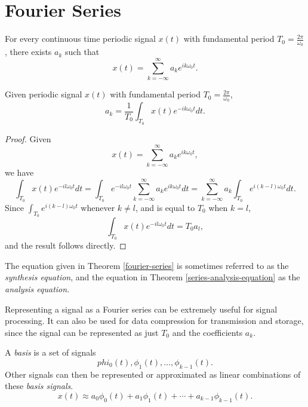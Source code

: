 \section{Fourier Series}

\begin{thm}\label{fourier-series}
    For every continuous time periodic signal $x(t)$ with fundamental period $T_0 = \frac{2\pi}{\omega_0}$, there exists $a_k$ such that
    \[x(t) = \sum_{k=-\infty}^{\infty}a_ke^{ik\omega_0t}.\]
\end{thm}

\begin{thm}\label{series-analysis-equation}
    Given periodic signal $x(t)$ with fundamental period $T_0 = \frac{2\pi}{\omega_0}$,
    \[a_k = \frac{1}{T_0}\int_{T_0}x(t)e^{-ik\omega_0t}dt.\]
\end{thm}

\begin{proof}
    Given \[x(t) = \sum_{k=-\infty}^{\infty}a_ke^{ik\omega_0t},\]
    we have
    \[\int_{T_0}x(t)e^{-il\omega_0t}dt = \int_{T_0}e^{-il\omega_0t}\sum_{k=-\infty}^{\infty}a_ke^{ik\omega_0t}dt = \sum_{k=-\infty}^{\infty}a_k\int_{T_0}e^{i(k-l)\omega_0t}dt.\]
    Since $\int_{T_0}e^{i(k-l)\omega_0t}$ whenever $k \neq l$, and is equal to $T_0$ when $k = l$,
    \[\int_{T_0}x(t)e^{-il\omega_0t}dt = T_0a_l,\]
    and the result follows directly.
\end{proof}

\begin{rmk}
    The equation given in Theorem \ref{fourier-series} is sometimes referred to as the \emph{synthesis equation}, and the equation in Theorem \ref{series-analysis-equation} as the \emph{analysis equation}.
\end{rmk}

\begin{rmk}
    Representing a signal as a Fourier series can be extremely useful for signal processing. It can also be used for data compression for transmission and storage, since the signal can be represented as just $T_0$ and the coefficients $a_k$. 
\end{rmk}

\begin{defn}
    A \emph{basis} is a set of signals
    \[phi_0(t), \phi_1(t), \ldots, \phi_{k-1}(t).\]
    Other signals can then be represented or approximated as linear combinations of these \emph{basis signals}.
    \[x(t) \approx a_0\phi_0(t) + a_1\phi_1(t) + \cdots + a_{k-1}\phi_{k-1}(t).\]
\end{defn}

